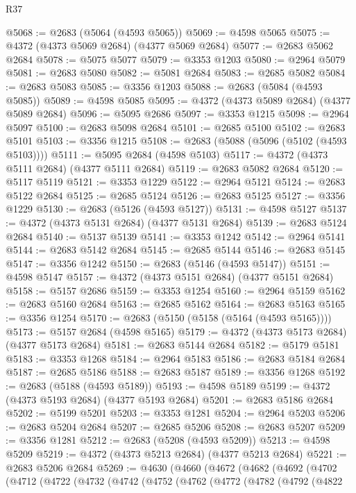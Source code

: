\begin{lexlean}{R37}
\begin{coremodule}
@5068 := @2683 (@5064 (@4593 @5065))
@5069 := @4598 @5065
@5075 := @4372 (@4373 @5069 @2684) (@4377 @5069 @2684)
@5077 := @2683 @5062 @2684
@5078 := @5075 @5077
@5079 := @3353 @1203
@5080 := @2964 @5079
@5081 := @2683 @5080
@5082 := @5081 @2684
@5083 := @2685 @5082
@5084 := @2683 @5083
@5085 := @3356 @1203
@5088 := @2683 (@5084 (@4593 @5085))
@5089 := @4598 @5085
@5095 := @4372 (@4373 @5089 @2684) (@4377 @5089 @2684)
@5096 := @5095 @2686
@5097 := @3353 @1215
@5098 := @2964 @5097
@5100 := @2683 @5098 @2684
@5101 := @2685 @5100
@5102 := @2683 @5101
@5103 := @3356 @1215
@5108 := @2683 (@5088 (@5096 (@5102 (@4593 @5103))))
@5111 := @5095 @2684 (@4598 @5103)
@5117 := @4372 (@4373 @5111 @2684) (@4377 @5111 @2684)
@5119 := @2683 @5082 @2684
@5120 := @5117 @5119
@5121 := @3353 @1229
@5122 := @2964 @5121
@5124 := @2683 @5122 @2684
@5125 := @2685 @5124
@5126 := @2683 @5125
@5127 := @3356 @1229
@5130 := @2683 (@5126 (@4593 @5127))
@5131 := @4598 @5127
@5137 := @4372 (@4373 @5131 @2684) (@4377 @5131 @2684)
@5139 := @2683 @5124 @2684
@5140 := @5137 @5139
@5141 := @3353 @1242
@5142 := @2964 @5141
@5144 := @2683 @5142 @2684
@5145 := @2685 @5144
@5146 := @2683 @5145
@5147 := @3356 @1242
@5150 := @2683 (@5146 (@4593 @5147))
@5151 := @4598 @5147
@5157 := @4372 (@4373 @5151 @2684) (@4377 @5151 @2684)
@5158 := @5157 @2686
@5159 := @3353 @1254
@5160 := @2964 @5159
@5162 := @2683 @5160 @2684
@5163 := @2685 @5162
@5164 := @2683 @5163
@5165 := @3356 @1254
@5170 := @2683 (@5150 (@5158 (@5164 (@4593 @5165))))
@5173 := @5157 @2684 (@4598 @5165)
@5179 := @4372 (@4373 @5173 @2684) (@4377 @5173 @2684)
@5181 := @2683 @5144 @2684
@5182 := @5179 @5181
@5183 := @3353 @1268
@5184 := @2964 @5183
@5186 := @2683 @5184 @2684
@5187 := @2685 @5186
@5188 := @2683 @5187
@5189 := @3356 @1268
@5192 := @2683 (@5188 (@4593 @5189))
@5193 := @4598 @5189
@5199 := @4372 (@4373 @5193 @2684) (@4377 @5193 @2684)
@5201 := @2683 @5186 @2684
@5202 := @5199 @5201
@5203 := @3353 @1281
@5204 := @2964 @5203
@5206 := @2683 @5204 @2684
@5207 := @2685 @5206
@5208 := @2683 @5207
@5209 := @3356 @1281
@5212 := @2683 (@5208 (@4593 @5209))
@5213 := @4598 @5209
@5219 := @4372 (@4373 @5213 @2684) (@4377 @5213 @2684)
@5221 := @2683 @5206 @2684
@5269 := @4630
    (@4660
      (@4672
        (@4682
          (@4692
            (@4702
              (@4712
                (@4722
                  (@4732
                    (@4742
                      (@4752
                        (@4762
                          (@4772
                            (@4782
                              (@4792
                                (@4822

\end{coremodule}
\end{lexlean}
